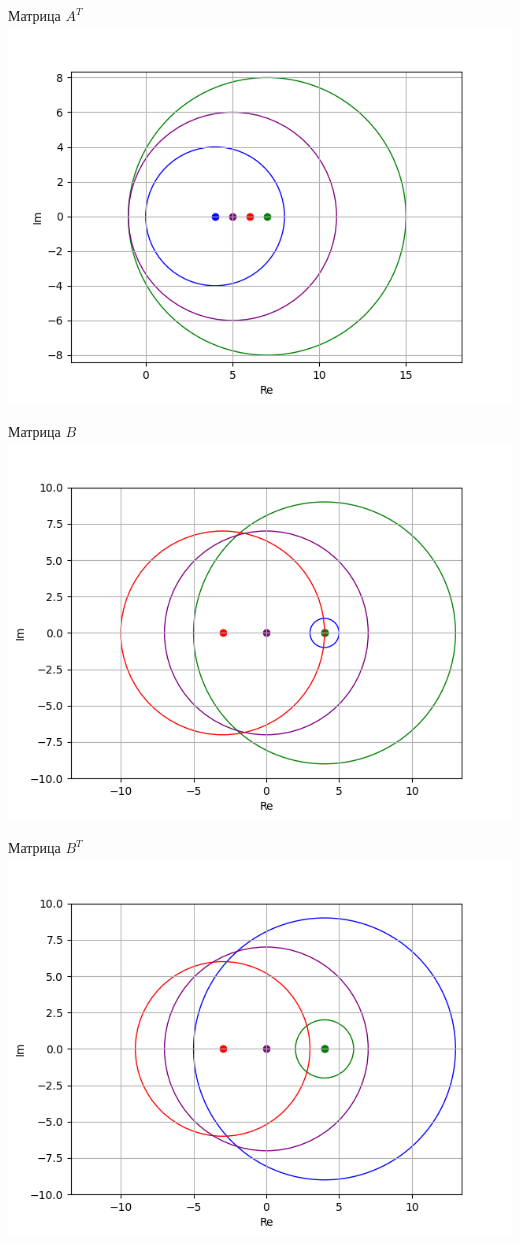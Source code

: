 \documentclass[a4paper,14pt]{article}
\begin{document}
\newpage
Матрица $A^T$\\
\includegraphics{matrix_at.png}

Матрица $B$\\
\includegraphics{matrix_b.png}

Матрица $B^T$\\
\includegraphics{matrix_bt.png}
\end{document}
